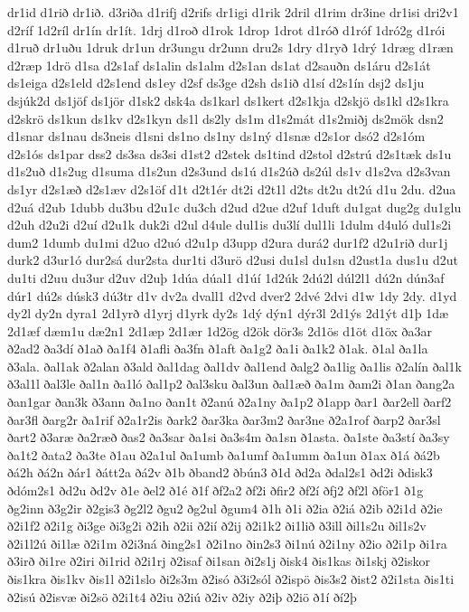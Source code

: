 {dr1id
d1rið
dr1ið.
d3riða
d1rifj
d2rifs
dr1igi
d1rik
2dril
d1rim
dr3ine
dr1isi
dri2v1
d2ríf
1d2ríl
dr1ín
dr1ít.
1drj
d1roð
d1rok
1drop
1drot
d1róð
d1róf
1dró2g
d1rói
d1ruð
dr1uðu
1druk
dr1un
dr3ungu
dr2unn
dru2s
1dry
d1ryð
1drý
1dræg
d1ræn
d2ræp
1drö
d1sa
d2s1af
ds1alin
ds1alm
d2s1an
ds1at
d2sauðn
ds1áru
d2s1át
ds1eiga
d2s1eld
d2s1end
ds1ey
d2sf
ds3ge
d2sh
ds1ið
d1sí
d2s1ín
dsj2
ds1ju
dsjúk2d
ds1jöf
ds1jör
d1sk2
dsk4a
ds1karl
ds1kert
d2s1kja
d2skjö
ds1kl
d2s1kra
d2skrö
ds1kun
ds1kv
d2s1kyn
ds1l
ds2ly
ds1m
d1s2mát
d1s2miðj
ds2mök
dsn2
d1snar
ds1nau
ds3neis
d1sni
ds1no
ds1ny
ds1ný
d1snæ
d2s1or
dsó2
d2s1óm
d2s1ós
ds1par
dss2
ds3sa
ds3si
d1st2
d2stek
ds1tind
d2stol
d2strú
d2s1tæk
ds1u
d1s2uð
d1s2ug
d1suma
d1s2un
d2s3und
ds1ú
d1s2úð
ds2úl
ds1v
d1s2va
d2s3van
ds1yr
d2s1æð
d2s1æv
d2s1öf
d1t
d2t1ér
dt2i
d2t1l
d2ts
dt2u
dt2ú
d1u
2du.
d2ua
d2uá
d2ub
1dubb
du3bu
d2u1c
du3ch
d2ud
d2ue
d2uf
1duft
du1gat
dug2g
du1glu
d2uh
d2u2i
d2uí
d2u1k
duk2i
d2ul
d4ule
dul1is
du3lí
dul1li
1dulm
d4uló
dul1s2i
dum2
1dumb
du1mi
d2uo
d2uó
d2u1p
d3upp
d2ura
durá2
dur1f2
d2u1rið
dur1j
durk2
d3ur1ó
dur2sá
dur2sta
dur1ti
d3urö
d2usi
du1sl
du1sn
d2ust1a
dus1u
d2ut
du1ti
d2uu
du3ur
d2uv
d2uþ
1dúa
dúal1
d1úí
1d2úk
2dú2l
dúl2l1
dú2n
dún3af
dúr1
dú2s
dúsk3
dú3tr
d1v
dv2a
dvall1
d2vd
dver2
2dvé
2dvi
d1w
1dy
2dy.
d1yd
dy2l
dy2n
dyra1
2d1yrð
d1yrj
d1yrk
dy2s
1dý
dýn1
dýr3l
2d1ýs
2d1ýt
d1þ
1dæ
2d1æf
dæm1u
dæ2n1
2d1æp
2d1ær
1d2ög
d2ök
dör3s
2d1ös
d1öt
d1öx
ða3ar
ð2ad2
ða3dí
ð1að
ða1f4
ð1afli
ða3fn
ð1aft
ða1g2
ða1i
ða1k2
ð1ak.
ð1al
ða1la
ð3ala.
ðal1ak
ð2alan
ð3ald
ðal1dag
ðal1dv
ðal1end
ðalg2
ða1lig
ða1lis
ð2alín
ðal1k
ð3al1l
ðal3le
ðal1n
ða1ló
ðal1p2
ðal3sku
ðal3un
ðal1æð
ða1m
ðam2i
ð1an
ðang2a
ðan1gar
ðan3k
ð3ann
ða1no
ðan1t
ð2anú
ð2a1ny
ða1p2
ð1app
ðar1
ðar2ell
ðarf2
ðar3fl
ðarg2r
ða1rif
ð2a1r2is
ðark2
ðar3ka
ðar3m2
ðar3ne
ð2a1rof
ðarp2
ðar3sl
ðart2
ð3aræ
ða2ræð
ðas2
ða3sar
ða1si
ða3s4m
ða1sn
ð1asta.
ða1ste
ða3stí
ða3sy
ða1t2
ðata2
ða3te
ð1au
ð2a1ul
ða1umb
ða1umf
ða1umm
ða1un
ð1ax
ð1á
ðá2b
ðá2h
ðá2n
ðár1
ðátt2a
ðá2v
ð1b
ðband2
ðbún3
ð1d
ðd2a
ðdal2s1
ðd2i
ðdisk3
ðdóm2s1
ðd2u
ðd2v
ð1e
ðel2
ð1é
ð1f
ðf2a2
ðf2i
ðfir2
ðf2í
ðfj2
ðf2l
ðför1
ð1g
ðg2inn
ð3g2ir
ð2gis3
ðg2l2
ðgu2
ðg2ul
ðgum4
ð1h
ð1i
ð2ia
ð2iá
ð2ib
ð2i1d
ð2ie
ð2i1f2
ð2i1g
ði3ge
ði3g2i
ð2ih
ð2ii
ð2ií
ð2ij
ð2i1k2
ði1lið
ð3ill
ðil1s2u
ðil1s2v
ð2i1l2ú
ði1læ
ð2i1m
ð2i3ná
ðing2s1
ð2i1no
ðin2s3
ði1nú
ð2i1ny
ð2io
ð2i1p
ði1ra
ð3irð
ði1re
ð2iri
ði1rid
ð2i1rj
ð2isaf
ði1san
ði2s1j
ðisk4
ðis1kas
ði1skj
ð2iskor
ðis1kra
ðis1kv
ðis1l
ð2i1slo
ði2s3m
ð2isó
ð3i2sól
ð2ispö
ðis3s2
ðist2
ð2i1sta
ðis1ti
ð2isú
ð2isvæ
ði2sö
ð2i1t4
ð2iu
ð2iú
ð2iv
ð2iy
ð2iþ
ð2iö
ð1í
ðí2þ
}
